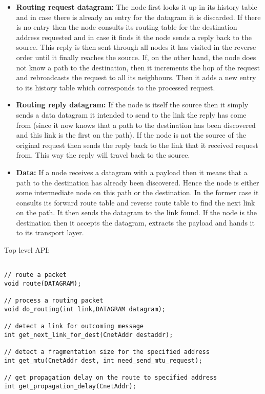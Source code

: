 \documentclass[11pt,a4paper,oneside]{report}
\begin{document}
\begin{itemize}
\item \noindent \textbf{Routing request datagram:}
The node first looks it up in its history table and in case there
is already an entry for the datagram it is discarded. If there is no entry then the node 
consults its routing table for the destination address requested and in case it finds it 
the node sends a reply back to the source. This reply is then sent through all nodes it 
has visited in the reverse order until it finally reaches the source. If, on the other hand,
the node does not know a path to the destination, then it increments the hop of the request 
and rebroadcasts the request to all its neighbours. Then it adds a new entry to its history
table which corresponds to the processed request.

\item \noindent \textbf{Routing reply datagram:}
  If the node is itself the source then it simply sends a data datagram it intended to send to the link
the reply has come from (since it now knows that a path to the destination has been discovered and 
this link is the first on the path). If the node is not the source of the original request then
 sends the reply back to the link that it received request from. This way the reply will travel back to
the source.  

\item \noindent \textbf{Data:}
  If a node receives a datagram with a payload then it means that a path to the destination has
already been discovered. Hence the node is either some intermediate node on this path or the 
destination. In the former case it consults its forward route table and reverse route table to find the next link on the path. It then sends the datagram to the link found. If the node is the destination then it accepts the datagram, extracts the payload and hands it to its transport layer.
\end{itemize}

    Top level API:  
  \begin{lstlisting}

// route a packet
void route(DATAGRAM);

// process a routing packet
void do_routing(int link,DATAGRAM datagram);

// detect a link for outcoming message
int get_next_link_for_dest(CnetAddr destaddr);

// detect a fragmentation size for the specified address
int get_mtu(CnetAddr dest, int need_send_mtu_request);

// get propagation delay on the route to specified address
int get_propagation_delay(CnetAddr);

  \end{lstlisting}
\newpage
\end{document}
